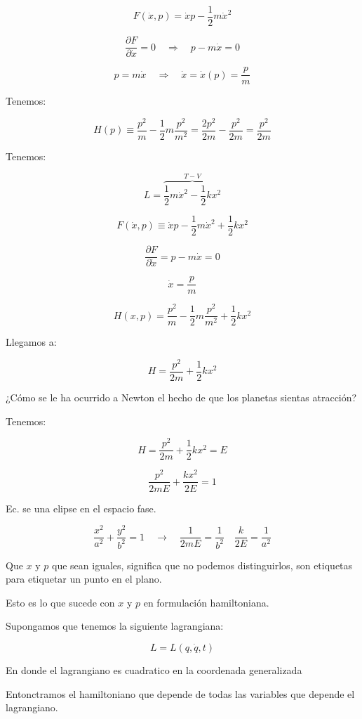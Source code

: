 \documentclass{article}
\begin{document}
\[ F(\dot{x}, p) = \dot{x}p - \frac{1}{2}m\dot{x}^{2}  \]

\[ \frac{ \partial F }{\partial \dot{x}} = 0 \quad \Rightarrow \quad p-m\dot{x} =0  \]


\[\boxed{ p=m\dot{x} } \quad \Rightarrow \quad \dot{x} = \dot{x}(p) = \boxed{ \frac{p}{m} }  \]

Tenemos:


\[ H(p) \equiv  \frac{ p^{2} }{m} - \frac{1}{2} m \frac{ p^{2} }{m^{2}} = \frac{2p^{2}}{2m} - \frac{p^{2}}{2m} = \boxed{\frac{p^{2}}{2m}  }\]


Tenemos:

\[L = \overbrace{\frac{1}{2} m \dot{x}^{2} - \frac{1}{2} kx^{2}}^{T-V}  \]


\[ F(\dot{x}, p) \equiv \dot{x}p - \frac{1}{2}m\dot{x}^{2} + \frac{1}{2}kx^{2} \]


\[ \frac{ \partial F }{\partial \dot{x}} = p-m\dot{x} =0 \]

\[  \boxed{ \dot{x} = \frac{p}{m} } \]

\[ H(x,p) = \frac{p^{2} }{m} - \frac{1}{2}m \frac{p^{2}}{m^{2}} + \frac{1}{2} kx^{2} \]

Llegamos a:

\[ H= \frac{p^{2}}{2m} + \frac{1}{2} kx^{2}  \]


¿Cómo se le ha ocurrido a Newton el hecho de que los planetas sientas atracción?

Tenemos:


\[ \boxed{H = \frac{p^{2}}{2m} + \frac{1}{2}kx^{2}} = E \]

\[ \frac{ p^{2} }{2mE} + \frac{kx^{2}}{2E}=1 \]

Ec. se una elipse en el espacio fase.

\[  \frac{x^{2}}{a^{2}} + \frac{y^{2}}{b^{2}} = 1 \quad \to \quad \frac{1}{2mE} = \frac{1}{b^{2}} \quad \frac{k}{2E} = \frac{1}{a^{2}}  \]


Que $x$ y $p$ que sean iguales, significa que no podemos distinguirlos, son etiquetas para etiquetar un punto en el plano.

Esto es lo que sucede con $x$ y $p$ en formulación hamiltoniana. 


Supongamos que tenemos la siguiente lagrangiana:

\[ L = L(q,\dot{q},t)   \]

En donde el lagrangiano es cuadratico en la coordenada generalizada

Entonctramos el hamiltoniano que depende de todas las variables que depende el lagrangiano.
\end{document}
